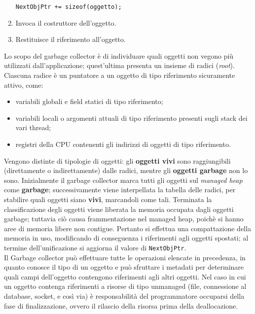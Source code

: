 \begin{solution}
\begin{enumerate}
\begin{center}
		\texttt{NextObjPtr += sizeof(oggetto);}

	\end{center}
	\item Invoca il costruttore dell'oggetto.
	\item Restituisce il riferimento all'oggetto.
\end{enumerate}

Lo scopo del garbage collector è di individuare quali oggetti non vegono più utilizzati dall'applicazione; quest'ultima presenta un insieme di radici (\textit{root}).
Ciascuna radice è un puntatore a un oggetto di tipo riferimento sicuramente attivo, come:

\begin{itemize}
	\item variabili globali e field statici di tipo riferimento;
	\item variabili locali o argomenti attuali di tipo riferimento presenti sugli stack dei vari thread;
	\item registri della CPU contenenti gli indirizzi di oggetti di tipo riferimento.
\end{itemize}

\raggedright Vengono distinte di tipologie di oggetti: gli \textbf{oggetti vivi} sono
raggiungibili (direttamente o indirettamente) dalle radici, mentre gli
\textbf{oggetti garbage} non lo sono.
\newline
Inizialmente il garbage collector marca tutti gli oggetti sul \textit{managed heap} come \textbf{garbage}; successivamente viene interpellata la tabella delle radici, per stabilire quali oggetti siano \textbf{vivi}, marcandoli come tali.
\newline
Terminata la classificazione degli oggetti viene liberata la memoria occupata
dagli oggetti garbage; tuttavia ciò causa frammentazione nel managed heap,
poichè si hanno aree di memoria libere non contigue.  Pertanto si effettua una
compattazione della memoria in uso, modificando di conseguenza i riferimenti
agli oggetti spostati; al termine dell'unificazione si aggiorna il valore di
\texttt{NextObjPtr}.  \\
Il Garbage collector può effettuare tutte le operazioni elencate in precedenza, in quanto conosce il tipo di un oggetto e può sfruttare i metadati per determinare quali campi dell'oggetto contengono riferimenti agli altri oggetti.
\newline
Nel caso in cui un oggetto contenga riferimenti a risorse di tipo unmanaged (file, connessione al database, socket, e così via) è responsabilità del programmatore occuparsi della fase di finalizzazione, ovvero il rilascio della risorsa prima della deallocazione.
\end{solution}


